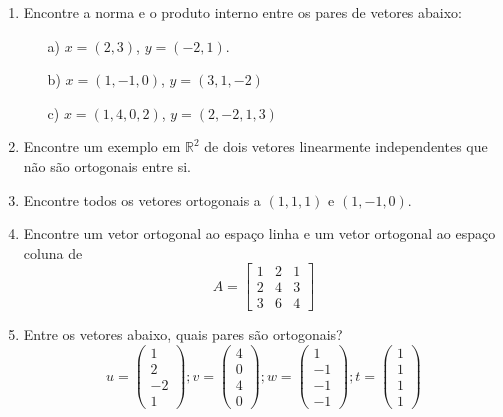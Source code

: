\documentclass[12pt]{article}
\begin{document}
\begin{enumerate}
   \item Encontre a norma e o produto interno entre os pares de vetores abaixo:
   \begin{itemize}
      \item[a)] $x = (2,3)$, $y = (-2,1)$.
      \item[b)] $x = (1,-1,0)$, $y = (3,1,-2)$
      \item[c)] $x = (1,4,0,2)$, $y=(2,-2,1,3)$
   \end{itemize}

   \item Encontre um exemplo em $\mathbb{R}^2$ de dois vetores linearmente independentes que não são ortogonais entre si. 

   \item Encontre todos os vetores ortogonais a $(1,1,1)$ e $(1, -1,0)$.

   \item Encontre um vetor ortogonal ao espaço linha e um vetor ortogonal ao espaço coluna de
   \begin{equation*}
      A =
      \begin{bmatrix}
         1 & 2 & 1\\
         2 & 4 & 3\\
         3 & 6 & 4
      \end{bmatrix}
   \end{equation*}

   \item Entre os vetores abaixo, quais pares são ortogonais?
   \begin{equation*}
      u =
      \begin{pmatrix}
         1\\2\\-2\\1
      \end{pmatrix}
      ; v = 
      \begin{pmatrix}
         4\\0\\4\\0
      \end{pmatrix}
      ; w = 
      \begin{pmatrix}
         1\\-1\\-1\\-1
      \end{pmatrix}
      ; t = 
      \begin{pmatrix}
         1\\1\\1\\1
      \end{pmatrix}
   \end{equation*}


\end{enumerate}
\end{document}
